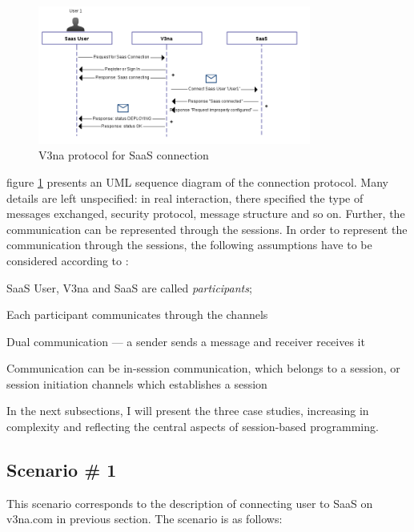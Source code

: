 \begin{figure}
\centering
\includegraphics[width=0.8\textwidth]{resources/v3na-protocol.png}
\caption{V3na protocol for SaaS connection}
\label{fig:v3na-protocol}
\end{figure}


figure \ref{fig:v3na-protocol} presents an UML sequence diagram of the connection protocol. Many details are left unspecified: in real interaction, there specified the type of messages exchanged, security protocol, message structure and so on. Further, the communication can be represented through the sessions. In order to represent the communication through the sessions, the following assumptions have to be considered according to \cite{structured-com-centered-prog}:

\begin{compactenum}
\item  SaaS User, V3na and SaaS are called \textit{participants};

\item  Each participant communicates through the channels

\item  Dual communication --- a sender sends a message and receiver receives it

\item  Communication can be in-session communication, which belongs to a session, or session initiation channels which establishes a session
\end{compactenum}

In the next subsections, I will present the three case studies, increasing in complexity and reflecting the central aspects of session-based programming.

\subsection{Scenario \# 1}

This scenario corresponds to the description of connecting user to SaaS on v3na.com in previous section. The scenario is as follows:

